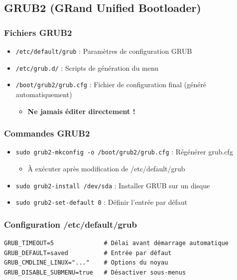 \documentclass[12pt,a4paper]{article}
\begin{document}
\subsection{GRUB2 (GRand Unified Bootloader)}

\subsubsection{Fichiers GRUB2}
\begin{itemize}
    \item \texttt{/etc/default/grub} : Paramètres de configuration GRUB
    \item \texttt{/etc/grub.d/} : Scripts de génération du menu
    \item \texttt{/boot/grub2/grub.cfg} : Fichier de configuration final (généré automatiquement)
    \begin{itemize}
        \item \textbf{Ne jamais éditer directement !}
    \end{itemize}
\end{itemize}

\subsubsection{Commandes GRUB2}
\begin{itemize}
    \item \texttt{sudo grub2-mkconfig -o /boot/grub2/grub.cfg} : Régénérer grub.cfg
    \begin{itemize}
        \item À exécuter après modification de /etc/default/grub
    \end{itemize}
    \item \texttt{sudo grub2-install /dev/sda} : Installer GRUB sur un disque
    \item \texttt{sudo grub2-set-default 0} : Définir l'entrée par défaut
\end{itemize}

\subsubsection{Configuration /etc/default/grub}
\begin{lstlisting}
GRUB_TIMEOUT=5              # Délai avant démarrage automatique
GRUB_DEFAULT=saved          # Entrée par défaut
GRUB_CMDLINE_LINUX="..."    # Options du noyau
GRUB_DISABLE_SUBMENU=true   # Désactiver sous-menus
\end{lstlisting}
\end{document}
